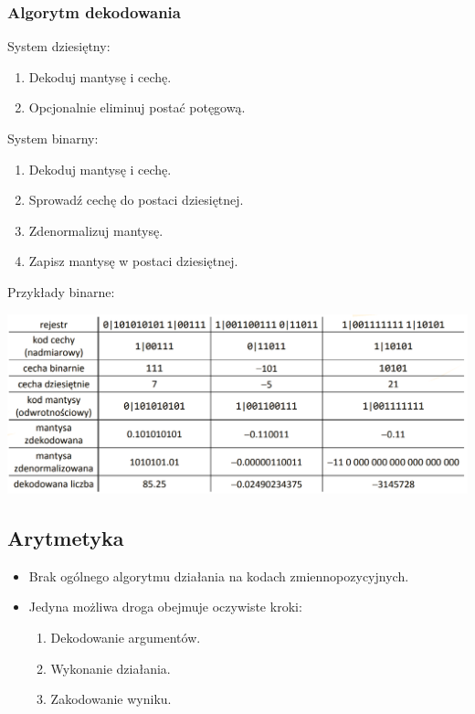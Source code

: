 \documentclass[12pt]{article}
\begin{document}
    \subsubsection{Algorytm dekodowania}
    
    System dziesiętny:
    \begin{enumerate}
        \item Dekoduj mantysę i cechę.
        \item Opcjonalnie eliminuj postać potęgową.
    \end{enumerate}
    
    System binarny:
    \begin{enumerate}
        \item Dekoduj mantysę i cechę.
        \item Sprowadź cechę do postaci dziesiętnej.
        \item Zdenormalizuj mantysę.
        \item Zapisz mantysę w postaci dziesiętnej.
    \end{enumerate}
    
    Przykłady binarne:
    
    \includegraphics[width=\linewidth]{graphics/number-repr/fl-pt-decode-bin.png}
    
    \subsection{Arytmetyka}
    \begin{itemize}
        \item Brak ogólnego algorytmu działania na kodach
        zmiennopozycyjnych.
        \item Jedyna możliwa droga obejmuje oczywiste
        kroki:
        \begin{enumerate}
            \item Dekodowanie argumentów.
            \item Wykonanie działania.
            \item Zakodowanie wyniku.
        \end{enumerate}
    \end{itemize}
    
\end{document}
